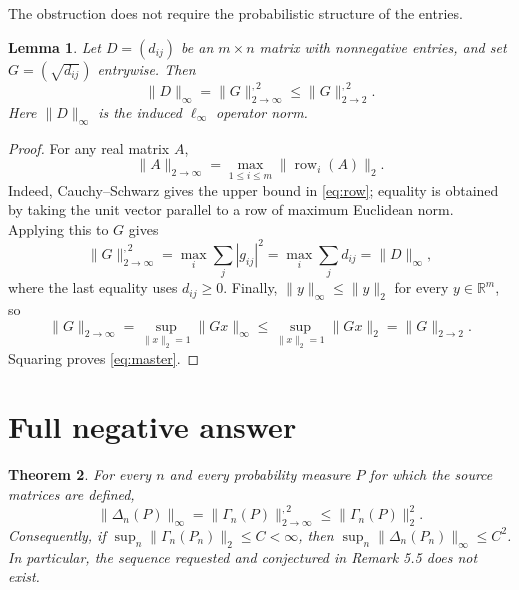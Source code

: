 \documentclass[11pt]{article}
\newtheorem{theorem}{Theorem}
\newtheorem{lemma}[theorem]{Lemma}
\newcommand{\R}{\mathbb R}
\newcommand{\opnorm}[3]{\lVert #1\rVert_{#2\to #3}}
\begin{document}
The obstruction does not require the probabilistic structure of the entries.

\begin{lemma}\label{lem:matrix}
Let $D=(d_{ij})$ be an $m\times n$ matrix with nonnegative entries, and set
$G=(\sqrt{d_{ij}})$ entrywise.  Then
\begin{equation}
                 \lVert D\rVert_\infty
             =\opnorm{G}{2}{\infty}^{,2}
             \leq \opnorm{G}{2}{2}^{,2}.
 \label{eq:master}
\end{equation}
Here $\lVert D\rVert_\infty$ is the induced $\ell_\infty$ operator norm.
\end{lemma}

\begin{proof}
For any real matrix $A$,
\begin{equation}
       \opnorm{A}{2}{\infty}
       =\max_{1\leq i\leq m}\lVert \operatorname{row}_i(A)\rVert_2.
 \label{eq:row}
\end{equation}
Indeed, Cauchy--Schwarz gives the upper bound in \eqref{eq:row}; equality is
obtained by taking the unit vector parallel to a row of maximum Euclidean
norm.  Applying this to $G$ gives
\[
 \opnorm{G}{2}{\infty}^{,2}
   =\max_i\sum_j |g_{ij}|^2
   =\max_i\sum_j d_{ij}
   =\lVert D\rVert_\infty,
\]
where the last equality uses $d_{ij}\geq0$.  Finally,
$\lVert y\rVert_\infty\leq\lVert y\rVert_2$ for every $y\in\R^m$, so
\[
  \opnorm{G}{2}{\infty}
   =\sup_{\lVert x\rVert_2=1}\lVert Gx\rVert_\infty
   \leq\sup_{\lVert x\rVert_2=1}\lVert Gx\rVert_2
   =\opnorm{G}{2}{2}.
\]
Squaring proves \eqref{eq:master}.
\end{proof}

\section{\hspace{0.25em}Full negative answer}

\begin{theorem}\label{thm:answer}
For every $n$ and every probability measure $P$ for which the source
matrices are defined,
\begin{equation}
 \boxed{\quad
 \lVert\Delta_n(P)\rVert_\infty
 =\opnorm{\Gamma_n(P)}{2}{\infty}^{,2}
 \leq\lVert\Gamma_n(P)\rVert_2^2.
 \quad}
 \label{eq:answer}
\end{equation}
Consequently, if
$\sup_n\lVert\Gamma_n(P_n)\rVert_2\leq C<\infty$, then
$\sup_n\lVert\Delta_n(P_n)\rVert_\infty\leq C^2$.  In particular, the
sequence requested and conjectured in Remark 5.5 does not exist.
\end{theorem}
\end{document}
